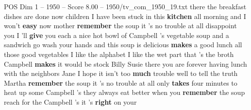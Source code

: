 \begin{textsample}{POS Dim 1 – 1950 – Score 8.00 – 1950/tv\_com\_1950\_19.txt}  \label{ex:f1_pos_019}
there the breakfast dishes are done now children I have been stuck in this \textbf{kitchen} all morning and I won't \textbf{easy} now mother \textbf{remember} the soup it 's no trouble at all disappoint you I 'll \textbf{give} you each a nice hot bowl of Campbell 's vegetable soup and a sandwich go wash your hands and this soup is delicious \textbf{makes} a good lunch all those good vegetables I like the alphabet I like the wet part that 's the broth Campbell \textbf{makes} it would be stock Billy Susie there you are forever having lunch with the neighbors Jane I hope it isn't too \textbf{much} trouble well to tell the truth Martha \textbf{remember} the soup it 's no trouble at all only \textbf{takes} four minutes to heat up some Campbell 's they always eat better when you \textbf{remember} the soup reach for the Campbell 's it 's \textbf{right} on your

\end{textsample}
